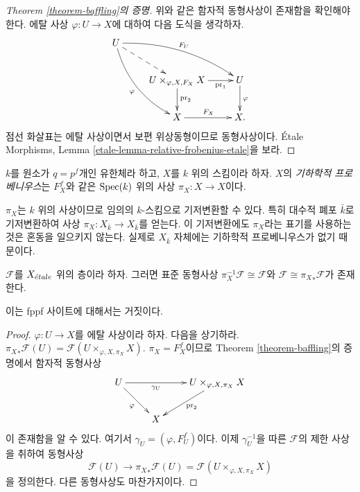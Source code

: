 \begin{proof}[Theorem \ref{theorem-baffling}의 증명]
위와 같은 함자적 동형사상이 존재함을 확인해야 한다. 에탈 사상
$\varphi : U \to X$에 대하여 다음 도식을 생각하자.
$$
\xymatrix{
U \ar@{-->}[rd] \ar@/^1pc/[rrd]^{F_U}
\ar@/_1pc/[rdd]_\varphi \\
& {U \times_{\varphi, X, F_X} X} \ar[r]_-{\text{pr}_1}
\ar[d]^{\text{pr}_2} & U \ar[d]^\varphi \\
& X \ar[r]^{F_X} & X.
}
$$
점선 화살표는 에탈 사상이면서 보편 위상동형이므로 동형사상이다.
\'Etale Morphisms, Lemma \ref{etale-lemma-relative-frobenius-etale}을 보라.
\end{proof}


\begin{definition}
\label{definition-geometric-frobenius}
$k$를 원소가 $q = p^f$개인 유한체라 하고, $X$를 $k$ 위의 스킴이라
하자. $X$의 {\it 기하학적 프로베니우스}는 $F_X^f$와 같은
$\mathop{\mathrm{Spec}}(k)$ 위의 사상 $\pi_X : X \to X$이다.
\end{definition}

\noindent
$\pi_X$는 $k$ 위의 사상이므로 임의의 $k$-스킴으로 기저변환할 수 있다.
특히 대수적 폐포 $\bar k$로 기저변환하여 사상
$\pi_X : X_{\bar k} \to X_{\bar k}$를 얻는다. 이 기저변환에도
$\pi_X$라는 표기를 사용하는 것은 혼동을 일으키지 않는다. 실제로
$X_{\bar k}$ 자체에는 기하학적 프로베니우스가 없기 때문이다.

\begin{lemma}
\label{lemma-sheaf-over-finite-field-has-frobenius-descent}
$\mathcal{F}$를 $X_{\acute{e}tale}$ 위의 층이라 하자. 그러면 표준 동형사상
$\pi_X^{-1} \mathcal{F} \cong \mathcal{F}$와
$\mathcal{F} \cong {\pi_X}_*\mathcal{F}$가 존재한다.
\end{lemma}

\noindent
이는 fppf 사이트에 대해서는 거짓이다.

\begin{proof}
$\varphi : U \to X$를 에탈 사상이라 하자. 다음을 상기하라.
${\pi_X}_* \mathcal{F} (U) = \mathcal{F} (U \times_{\varphi, X, \pi_X} X)$.
$\pi_X = F_X^f$이므로 Theorem \ref{theorem-baffling}의 증명에서
함자적 동형사상
$$
\xymatrix{
U \ar[rd]_{\varphi} \ar[rr]_-{\gamma_U}
& & U \times_{\varphi, X, \pi_X} X \ar[ld]^{\text{pr}_2} \\
& X
}
$$
이 존재함을 알 수 있다. 여기서 $\gamma_U = (\varphi, F_U^f)$이다.
이제 $\gamma_U^{-1}$을 따른 $\mathcal{F}$의 제한 사상을 취하여
동형사상
$$
\mathcal{F} (U) \longrightarrow {\pi_X}_* \mathcal{F} (U) =
\mathcal{F} (U \times_{\varphi, X, \pi_X} X)
$$
을 정의한다. 다른 동형사상도 마찬가지이다.
\end{proof}

